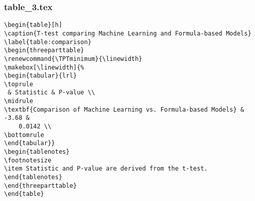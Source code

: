 \documentclass[11pt]{article}
\begin{document}
\subsubsection*{table\_3.tex}

\begin{Verbatim}[tabsize=4]
\begin{table}[h]
\caption{T-test comparing Machine Learning and Formula-based Models}
\label{table:comparison}
\begin{threeparttable}
\renewcommand{\TPTminimum}{\linewidth}
\makebox[\linewidth]{%
\begin{tabular}{lrl}
\toprule
 & Statistic & P-value \\
\midrule
\textbf{Comparison of Machine Learning vs. Formula-based Models} & -3.68 &
	0.0142 \\
\bottomrule
\end{tabular}}
\begin{tablenotes}
\footnotesize
\item Statistic and P-value are derived from the t-test.
\end{tablenotes}
\end{threeparttable}
\end{table}

\end{Verbatim}
\end{document}
